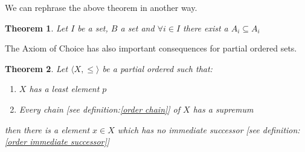 \documentclass{book}
\newcommand{\tmtextbf}[1]{\text{{\bfseries{#1}}}}
\newtheorem{theorem}{Theorem}
\begin{document}
We can rephrase the above theorem in another way.

\begin{theorem}
  Let $I$ be a set, $B$ a set and $\forall i \in I$ there exist a $A_i
  \subseteq A_i$
\end{theorem}

The Axiom of Choice has also important consequences for partial ordered sets.

\begin{theorem}
  \label{choice existence of successor}Let $\langle X, \leqslant \rangle$ be a
  partial ordered \tmtextbf{set} such that:
  \begin{enumerate}
    \item $X$ has a least element $p$
    
    \item Every chain [see definition:\ref{order chain}] of $X$ has a supremum
  \end{enumerate}
  then there is a element $x \in X$ which has no immediate successor [see
  definition: \ref{order immediate successor}]
\end{theorem}
\end{document}
